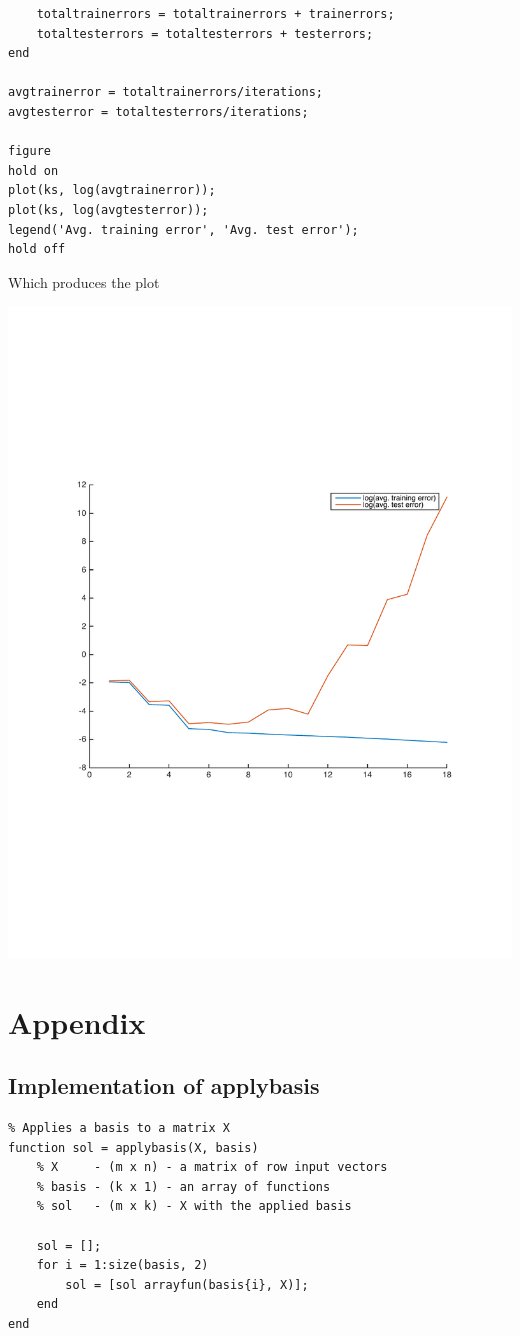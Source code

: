 \documentclass[11pt]{article}
\begin{document}
\begin{itemize}
\begin{lstlisting}
    totaltrainerrors = totaltrainerrors + trainerrors;
    totaltesterrors = totaltesterrors + testerrors;
end

avgtrainerror = totaltrainerrors/iterations;
avgtesterror = totaltesterrors/iterations;

figure
hold on
plot(ks, log(avgtrainerror));
plot(ks, log(avgtesterror));
legend('Avg. training error', 'Avg. test error');
hold off\end{lstlisting}
        Which produces the plot
        \begin{center}
            \includegraphics[width=\linewidth]{3e}
        \end{center}

\end{itemize}


\section{Appendix}
    \subsection{Implementation of applybasis}
        \begin{lstlisting}
% Applies a basis to a matrix X
function sol = applybasis(X, basis)
    % X     - (m x n) - a matrix of row input vectors
    % basis - (k x 1) - an array of functions
    % sol   - (m x k) - X with the applied basis
    
    sol = [];
    for i = 1:size(basis, 2)
        sol = [sol arrayfun(basis{i}, X)];
    end
end\end{lstlisting}
    
\end{document}
